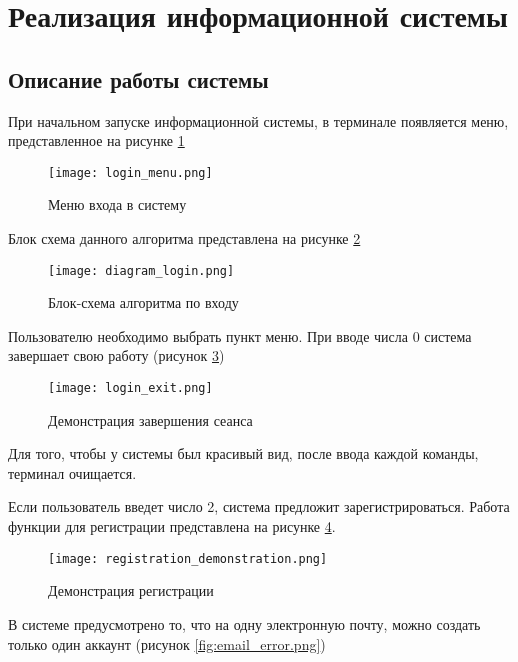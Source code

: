 \section{Реализация информационной системы}

\subsection{Описание работы системы}

При начальном запуске информационной системы, в терминале появляется меню, представленное на рисунке \ref{fig:login_menu.png}

\begin{figure}[h]
    \centering
    \texttt{[image: login\_menu.png]}
    \caption{Меню входа в систему}
    \label{fig:login_menu.png}
\end{figure}

Блок схема данного алгоритма представлена на рисунке \ref{fig:diagram1}

\begin{figure}[h]
    \centering
    \texttt{[image: diagram\_login.png]}
    \caption{Блок-схема алгоритма по входу}
    \label{fig:diagram1}
\end{figure}


Пользователю необходимо выбрать пункт меню. При вводе числа 0 система завершает свою работу (рисунок \ref{fig:login_exit.png})

\begin{figure}[h]
    \centering
    \texttt{[image: login\_exit.png]}
    \caption{Демонстрация завершения сеанса}
    \label{fig:login_exit.png}
\end{figure}

Для того, чтобы у системы был красивый вид, после ввода каждой команды, терминал очищается.

Если пользователь введет число 2, система предложит зарегистрироваться. Работа функции для регистрации представлена на рисунке \ref{fig:registration_demonstration.png}.

\begin{figure}[h]
    \centering
    \texttt{[image: registration\_demonstration.png]}
    \caption{Демонстрация регистрации}
    \label{fig:registration_demonstration.png}
\end{figure}

В системе предусмотрено то, что на одну электронную почту, можно создать только один аккаунт (рисунок \ref{fig:email_error.png})

